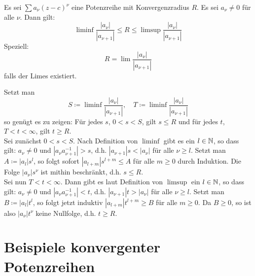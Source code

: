\begin{satz}[Quotientenkriterium]
	Es sei $ \sum a_\nu(z-c)^\nu $ eine Potenzreihe mit Konvergenzradius $ R $. Es sei $ a_\nu\neq 0 $ f\"ur alle $ \nu $. Dann gilt:
	\[ \liminf\frac{|a_\nu|}{|a_{\nu+1}|}\leq R\leq\limsup\frac{|a_\nu|}{|a_{\nu+1}|} \]
	Speziell:
	\[ R=\lim\frac{|a_\nu|}{|a_{\nu+1}|} \]
	falls der Limes existiert.
\end{satz}
\begin{beweis}
	Setzt man \[ S\coloneqq\liminf\frac{|a_\nu|}{|a_{\nu+1}|},\quad T\coloneqq\liminf\frac{|a_\nu|}{|a_{\nu+1}|} \]
	so gen\"ugt es zu zeigen: F\"ur jedes $ s $, $ 0<s<S $, gilt $ s\leq R $ und f\"ur jedes $ t $, $ T<t<\infty $, gilt $ t\geq R $.\\
	Sei zun\"achst $ 0<s<S $. Nach Definition von $ \liminf $ gibt es ein $ l\in\mathbb{N} $, so dass gilt:
	$ a_\nu\neq 0 $ und $ |a_\nu a_{\nu+1}^{-1}|>s $, d.h. $ |a_{\nu+1}|s<|a_\nu| $ f\"ur alle $ \nu\geq l $. Setzt man $ A\coloneqq |a_l|s^l $, so folgt sofort $ |a_{l+m}|s^{l+m}\leq A $ f\"ur alle $ m\geq 0 $ durch Induktion. Die Folge $ |a_\nu|s^\nu $ ist mithin beschr\"ankt, d.h. $ s\leq R $.\\
	Sei nun $ T<t<\infty $. Dann gibt es laut Definition von $ \limsup $ ein $ l\in\mathbb{N} $, so dass gilt: $ a_\nu\neq 0 $ und $ |a_\nu a_{\nu+1}^{-1}|<t $, d.h. $ |a_{\nu+1}|t>|a_\nu| $ f\"ur alle $ \nu\geq l $. Setzt man $ B\coloneqq |a_l|t^l $, so folgt jetzt induktiv $ |a_{l+m}|t^{l+m}\geq B $ f\"ur alle $ m\geq 0 $. Da $ B\geq 0 $, so ist also $ |a_\nu|t^\nu $ keine Nullfolge, d.h. $ t\geq R $.
\end{beweis}
\section{Beispiele konvergenter Potenzreihen}
